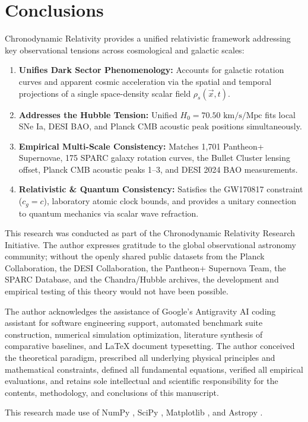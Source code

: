 \documentclass[aps,prd,reprint,superscriptaddress,nofootinbib,floatfix,amsmath,amssymb]{revtex4-2}
\begin{document}
\section{Conclusions}
\label{sec:conclusions}

Chronodynamic Relativity provides a unified relativistic framework addressing key observational tensions across cosmological and galactic scales:
\begin{enumerate}
    \item \textbf{Unifies Dark Sector Phenomenology:} Accounts for galactic rotation curves and apparent cosmic acceleration via the spatial and temporal projections of a single space-density scalar field $\rho_s(\vec{x}, t)$.
    \item \textbf{Addresses the Hubble Tension:} Unified $H_0 = 70.50\text{ km/s/Mpc}$ fits local SNe Ia, DESI BAO, and Planck CMB acoustic peak positions simultaneously.
    \item \textbf{Empirical Multi-Scale Consistency:} Matches 1,701 Pantheon+ Supernovae, 175 SPARC galaxy rotation curves, the Bullet Cluster lensing offset, Planck CMB acoustic peaks 1--3, and DESI 2024 BAO measurements.
    \item \textbf{Relativistic \& Quantum Consistency:} Satisfies the GW170817 constraint ($c_g = c$), laboratory atomic clock bounds, and provides a unitary connection to quantum mechanics via scalar wave refraction.
\end{enumerate}

\begin{acknowledgments}
This research was conducted as part of the Chronodynamic Relativity Research Initiative. The author expresses gratitude to the global observational astronomy community; without the openly shared public datasets from the Planck Collaboration, the DESI Collaboration, the Pantheon+ Supernova Team, the SPARC Database, and the Chandra/Hubble archives, the development and empirical testing of this theory would not have been possible.

The author acknowledges the assistance of Google's Antigravity AI coding assistant for software engineering support, automated benchmark suite construction, numerical simulation optimization, literature synthesis of comparative baselines, and \LaTeX{} document typesetting. The author conceived the theoretical paradigm, prescribed all underlying physical principles and mathematical constraints, defined all fundamental equations, verified all empirical evaluations, and retains sole intellectual and scientific responsibility for the contents, methodology, and conclusions of this manuscript.

This research made use of NumPy \cite{numpy2020}, SciPy \cite{scipy2020}, Matplotlib \cite{matplotlib2007}, and Astropy \cite{astropy2022}.
\end{acknowledgments}
\end{document}
